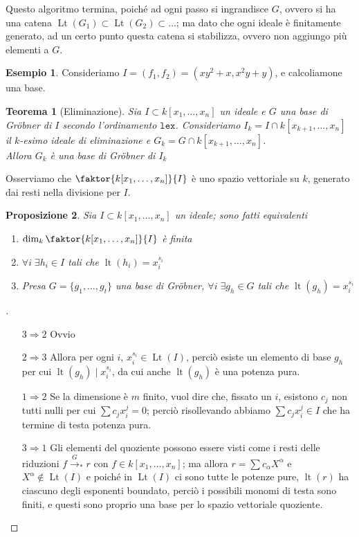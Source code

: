 \documentclass[a4paper,10pt]{article}
\theoremstyle{plain}
\newtheorem{thm}{Teorema}[section]
\newtheorem{prop}[thm]{Proposizione}
\theoremstyle{definition}
\newtheorem*{exmp}{Esempio}
\newenvironment{myproof}[1][\proofname]{%
  \begin{proof}[#1]$ $\par\nobreak\ignorespaces
}{%
  \qedhere
  \end{proof}
}
\DeclareMathOperator{\lt}{lt}
\DeclareMathOperator{\Lt}{Lt}
\begin{document}
Questo algoritmo termina, poiché ad ogni passo si ingrandisce $G$, ovvero si ha una catena $\Lt(G_1)\subset\Lt(G_2)\subset\dots$; ma dato che ogni ideale è finitamente generato, ad un certo punto questa catena si stabilizza, ovvero non aggiungo più elementi a $G$.\\
\begin{exmp}
    Consideriamo $I=(f_1,f_2)=(xy^2+x,x^2y+y)$, e calcoliamone una base.
\end{exmp}

\begin{thm}[Eliminazione]
    Sia $I\subset k[x_1,\dots,x_n]$ un ideale e $G$ una base di Gr\"obner di $I$ secondo l'ordinamento $\mathtt{lex}$. Consideriamo $I_k=I\cap k[x_{k+1},\dots,x_n]$ il $k$-esimo ideale di eliminazione e $G_k=G\cap k[x_{k+1},\dots,x_n]$.\\
    Allora $G_k$ è una base di Gr\"obner di $I_k$
\end{thm}

Osserviamo che $\faktor{k[x_1,\dots,x_n]}{I}$ è uno spazio vettoriale su $k$, generato dai resti nella divisione per $I$.
\begin{prop}
    Sia $I\subset k[x_1,\dots,x_n]$ un ideale; sono fatti equivalenti
    \begin{enumerate}
        \item $\dim_k \faktor{k[x_1,\dots,x_n]}{I}$ è finita
        \item $\forall i\;\exists h_i\in I$ tali che $\lt(h_i)=x_i^{s_i}$
        \item Presa $G=\{g_1,\dots,g_t\}$ una base di Gr\"obner, $\forall i\;\exists g_h\in G$ tali che $\lt(g_h)=x_i^{s_i}$
    \end{enumerate}
\end{prop}
\begin{myproof}
    \begin{itemize}
        \item[$3\Rightarrow2$] Ovvio
        \item[$2\Rightarrow3$] Allora per ogni $i$, $x_i^{s_i}\in\Lt(I)$, perciò esiste un elemento di base $g_h$ per cui $\lt(g_h)\mid x_i^{s_i}$, da cui anche $\lt(g_h)$ è una potenza pura.
        \item[$1\Rightarrow2$] Se la dimensione è $m$ finito, vuol dire che, fissato un $i$, esistono $c_j$ non tutti nulli per cui $\sum c_j x_i^j=0$; perciò risollevando abbiamo $\sum c_j x_i^j\in I$ che ha termine di testa potenza pura.
        \item[$3\Rightarrow1$] Gli elementi del quoziente possono essere visti come i resti delle riduzioni $f\xrightarrow{G}_\ast r$ con $f\in k[x_1,\dots,x_n]$; ma allora $r=\sum c_\alpha X^\alpha$ e $X^\alpha\not\in\Lt(I)$ e poiché in $\Lt(I)$ ci sono tutte le potenze pure, $\lt(r)$ ha ciascuno degli esponenti boundato, perciò i possibili monomi di testa sono finiti, e questi sono proprio una base per lo spazio vettoriale quoziente.
    \end{itemize}
\end{myproof}
\end{document}
